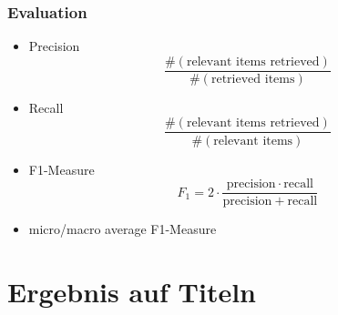 \documentclass[12pt, xcolor=table]{beamer}
\begin{document}
\begin{frame}
    \frametitle{Evaluation}
    \begin{itemize}
        \item Precision \[\frac{\#(\text{relevant items retrieved})}{\#(\text{retrieved items})}\]
        \item Recall \[\frac{\#(\text{relevant items retrieved})}{\#(\text{relevant items})}\]
        \item F1-Measure \[F_1 = 2 \cdot \frac{\mathrm{precision} \cdot \mathrm{recall}}{\mathrm{precision} + \mathrm{recall}}\]
        \item micro/macro average F1-Measure
    \end{itemize}
\end{frame}

\section{Ergebnis auf Titeln} %
\label{sec:Ergebnis}
\end{document}
